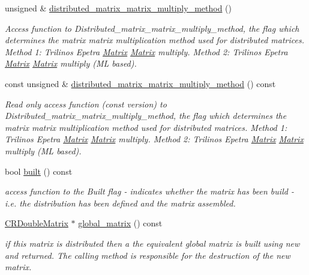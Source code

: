 \begin{DoxyCompactItemize}
unsigned \& \hyperlink{classoomph_1_1CRDoubleMatrix_a311cf35d030c6cc22b389c2542a4089c}{distributed\+\_\+matrix\+\_\+matrix\+\_\+multiply\+\_\+method} ()
\begin{DoxyCompactList}\small\item\em Access function to Distributed\+\_\+matrix\+\_\+matrix\+\_\+multiply\+\_\+method, the flag which determines the matrix matrix multiplication method used for distributed matrices. Method 1\+: Trilinos Epetra \hyperlink{classoomph_1_1Matrix}{Matrix} \hyperlink{classoomph_1_1Matrix}{Matrix} multiply. Method 2\+: Trilinos Epetra \hyperlink{classoomph_1_1Matrix}{Matrix} \hyperlink{classoomph_1_1Matrix}{Matrix} multiply (ML based). \end{DoxyCompactList}\item 
const unsigned \& \hyperlink{classoomph_1_1CRDoubleMatrix_a61b0b02e40f94ddceecafe38626e7ad2}{distributed\+\_\+matrix\+\_\+matrix\+\_\+multiply\+\_\+method} () const
\begin{DoxyCompactList}\small\item\em Read only access function (const version) to Distributed\+\_\+matrix\+\_\+matrix\+\_\+multiply\+\_\+method, the flag which determines the matrix matrix multiplication method used for distributed matrices. Method 1\+: Trilinos Epetra \hyperlink{classoomph_1_1Matrix}{Matrix} \hyperlink{classoomph_1_1Matrix}{Matrix} multiply. Method 2\+: Trilinos Epetra \hyperlink{classoomph_1_1Matrix}{Matrix} \hyperlink{classoomph_1_1Matrix}{Matrix} multiply (ML based). \end{DoxyCompactList}\item 
bool \hyperlink{classoomph_1_1CRDoubleMatrix_aa0503bc64ef0ccb60cb7d7e645425a62}{built} () const
\begin{DoxyCompactList}\small\item\em access function to the Built flag -\/ indicates whether the matrix has been build -\/ i.\+e. the distribution has been defined and the matrix assembled. \end{DoxyCompactList}\item 
\hyperlink{classoomph_1_1CRDoubleMatrix}{C\+R\+Double\+Matrix} $\ast$ \hyperlink{classoomph_1_1CRDoubleMatrix_a984602c9df0c573451f315a025820ced}{global\+\_\+matrix} () const
\begin{DoxyCompactList}\small\item\em if this matrix is distributed then a the equivalent global matrix is built using new and returned. The calling method is responsible for the destruction of the new matrix. \end{DoxyCompactList}\item 

\end{DoxyCompactItemize}
